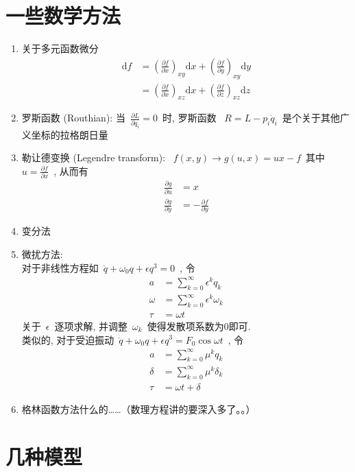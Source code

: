 \documentclass[11pt,a4paper]{article}%
\newcommand{\dif}{\mathrm{d}}
\renewcommand{\[}{~$\displaystyle}
\renewcommand{\]}{$~}%
\newcommand{\pard}[2]{\ensuremath{\frac{\partial #1}{\partial #2}}}
\begin{document}
\section{一些数学方法}
	\begin{enumerate}
	  \item 关于多元函数微分
	  \begin{align*}
	    \dif f &= \left(\frac{\partial f}{\partial x}\right)_{xy}\dif x + \left(\frac{\partial f}{\partial y}\right)_{xy}\dif y \\
	    &= \left(\frac{\partial f}{\partial x}\right)_{xz}\dif x + \left(\frac{\partial f}{\partial z}\right)_{xz}\dif z
	  \end{align*}
	  \item 罗斯函数 (Routhian): 当\[\pard{L}{q_i} = 0\]时, 罗斯函数 \[R = L - p_i\dot{q}_i\]是个关于其他广义坐标的拉格朗日量
	  \item 勒让德变换 (Legendre transform): \[f(x,y)\rightarrow g(u,x) = ux-f\]其中\[u = \frac{\partial f}{\partial x}\], 从而有
	  \begin{align*}
	   \frac{\partial g}{\partial u} &= x \\
	   \frac{\partial g}{\partial y} &= -\frac{\partial f}{\partial y}
	  \end{align*}
	  \item 变分法
	  \item 微扰方法: \\
	  对于非线性方程如\[\ddot q + \omega_0 q + \epsilon q^3 = 0\], 令
	  \begin{align*}
	   a &= \sum_{k=0}^{\infty}\epsilon^k q_k \\
	   \omega &= \sum_{k=0}^{\infty} \epsilon^k \omega_k \\
	   \tau &= \omega t
	  \end{align*}
	  关于\[\epsilon\]逐项求解, 并调整\[\omega_k\]使得发散项系数为0即可. \\
	  类似的, 对于受迫振动\[\ddot q + \omega_0 q + \epsilon q^3 = F_0 \cos \omega t\], 令
	  \begin{align*}
	   a &= \sum_{k=0}^{\infty}\mu^k q_k \\
	   \delta &= \sum_{k=0}^{\infty}\mu^k\delta_k \\
	   \tau &= \omega t + \delta
	  \end{align*}
	  \item 格林函数方法什么的……（数理方程讲的要深入多了。。）
	\end{enumerate}

\section{几种模型}
\end{document}
